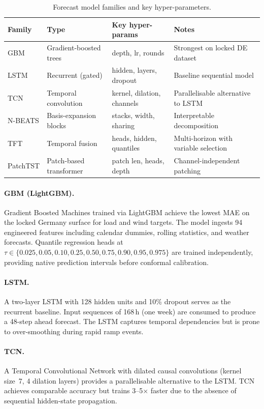 \begin{table}[ht]
\centering
\caption{Forecast model families and key hyper-parameters.}
\label{tab:model-families}
\begin{tabular}{llll}
\toprule
\textbf{Family} & \textbf{Type} & \textbf{Key hyper-params} &
  \textbf{Notes} \\
\midrule
GBM        & Gradient-boosted trees & depth, lr, rounds &
  Strongest on locked DE dataset \\
LSTM       & Recurrent (gated)      & hidden, layers, dropout &
  Baseline sequential model \\
TCN        & Temporal convolution   & kernel, dilation, channels &
  Parallelisable alternative to LSTM \\
N-BEATS    & Basis-expansion blocks & stacks, width, sharing &
  Interpretable decomposition \\
TFT        & Temporal fusion        & heads, hidden, quantiles &
  Multi-horizon with variable selection \\
PatchTST   & Patch-based transformer& patch len, heads, depth &
  Channel-independent patching \\
\bottomrule
\end{tabular}
\end{table}

\paragraph{GBM (LightGBM).}
Gradient Boosted Machines trained via LightGBM achieve the lowest MAE on
the locked Germany surface for load and wind targets.  The model ingests
94 engineered features including calendar dummies, rolling statistics, and
weather forecasts.  Quantile regression heads at $\tau \in
\{0.025, 0.05, 0.10, 0.25, 0.50, 0.75, 0.90, 0.95, 0.975\}$ are trained
independently, providing native prediction intervals before conformal
calibration.

\paragraph{LSTM.}
A two-layer LSTM with 128 hidden units and 10\% dropout serves as the
recurrent baseline.  Input sequences of 168\,h (one week) are consumed to
produce a 48-step ahead forecast.  The LSTM captures temporal dependencies
but is prone to over-smoothing during rapid ramp events.

\paragraph{TCN.}
A Temporal Convolutional Network with dilated causal convolutions
(kernel size~7, 4 dilation layers) provides a parallelisable alternative
to the LSTM.  TCN achieves comparable accuracy but trains 3--5$\times$
faster due to the absence of sequential hidden-state propagation.

